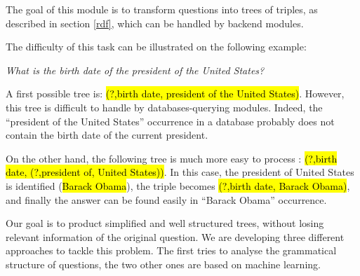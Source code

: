 
The goal of this module is to transform questions into trees of triples, as described in section \ref{rdf}, which can be handled by backend modules.

The difficulty of this task can be illustrated on the following example: 
\begin{center}
 \textit{What is the birth date of the president of the United States?}
\end{center}

A first possible tree is: \hl{(?,birth date, president of the United States)}. However, this tree is difficult to handle by databases-querying modules. Indeed, the ``president of the United States'' occurrence in a database probably does not contain the birth date of the current president. 

On the other hand, the following tree is much more easy to process : \hl{(?,birth date, (?,president of, United States))}. In this case, the president of United States is identified (\hl{Barack Obama}), the triple becomes \hl{(?,birth date, Barack Obama)}, and finally the answer can be found easily in ``Barack Obama'' occurrence.

Our goal is to product simplified and well structured trees, without losing relevant information of the original question. We are developing three different approaches to tackle this problem. The first tries to analyse the grammatical structure of questions, the two other ones are based on machine learning.